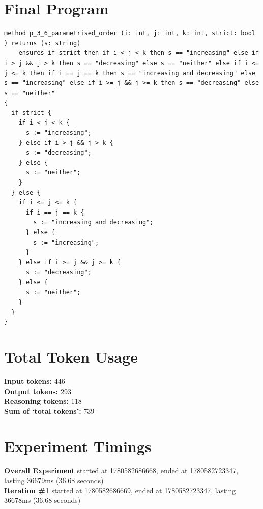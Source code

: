 \documentclass{article}
\begin{document}
\section*{Final Program}
\begin{lstlisting}
method p_3_6_parametrised_order (i: int, j: int, k: int, strict: bool ) returns (s: string)
	ensures if strict then if i < j < k then s == "increasing" else if i > j && j > k then s == "decreasing" else s == "neither" else if i <= j <= k then if i == j == k then s == "increasing and decreasing" else s == "increasing" else if i >= j && j >= k then s == "decreasing" else s == "neither"
{
  if strict {
    if i < j < k {
      s := "increasing";
    } else if i > j && j > k {
      s := "decreasing";
    } else {
      s := "neither";
    }
  } else {
    if i <= j <= k {
      if i == j == k {
        s := "increasing and decreasing";
      } else {
        s := "increasing";
      }
    } else if i >= j && j >= k {
      s := "decreasing";
    } else {
      s := "neither";
    }
  }
}
\end{lstlisting}
\section*{Total Token Usage}
\textbf{Input tokens: }446
\\\textbf{Output tokens: }293
\\\textbf{Reasoning tokens: }118
\\\textbf{Sum of `total tokens': }739
\section*{Experiment Timings}
\textbf{Overall Experiment} started at 1780582686668, ended at 1780582723347, lasting 36679ms (36.68 seconds)
\\\textbf{Iteration \#1} started at 1780582686669, ended at 1780582723347, lasting 36678ms (36.68 seconds)
\end{document}
